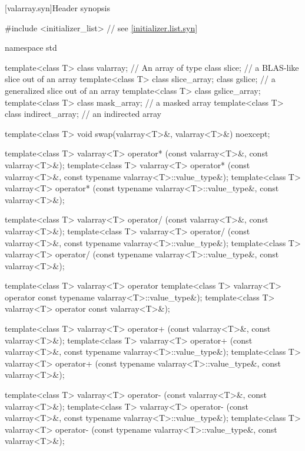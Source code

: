 [valarray.syn]{Header  synopsis}
%
\begin{codeblock}
#include <initializer_list>     // see \ref{initializer.list.syn}

namespace std {
  template<class T> class valarray;         // An array of type 
  class slice;                              // a BLAS-like slice out of an array
  template<class T> class slice_array;
  class gslice;                             // a generalized slice out of an array
  template<class T> class gslice_array;
  template<class T> class mask_array;       // a masked array
  template<class T> class indirect_array;   // an indirected array

  template<class T> void swap(valarray<T>&, valarray<T>&) noexcept;

  template<class T> valarray<T> operator* (const valarray<T>&, const valarray<T>&);
  template<class T> valarray<T> operator* (const valarray<T>&,
                                           const typename valarray<T>::value_type&);
  template<class T> valarray<T> operator* (const typename valarray<T>::value_type&,
                                           const valarray<T>&);

  template<class T> valarray<T> operator/ (const valarray<T>&, const valarray<T>&);
  template<class T> valarray<T> operator/ (const valarray<T>&,
                                           const typename valarray<T>::value_type&);
  template<class T> valarray<T> operator/ (const typename valarray<T>::value_type&,
                                           const valarray<T>&);

  template<class T> valarray<T> operator%
  template<class T> valarray<T> operator%
                                           const typename valarray<T>::value_type&);
  template<class T> valarray<T> operator%
                                           const valarray<T>&);

  template<class T> valarray<T> operator+ (const valarray<T>&, const valarray<T>&);
  template<class T> valarray<T> operator+ (const valarray<T>&,
                                           const typename valarray<T>::value_type&);
  template<class T> valarray<T> operator+ (const typename valarray<T>::value_type&,
                                           const valarray<T>&);

  template<class T> valarray<T> operator- (const valarray<T>&, const valarray<T>&);
  template<class T> valarray<T> operator- (const valarray<T>&,
                                           const typename valarray<T>::value_type&);
  template<class T> valarray<T> operator- (const typename valarray<T>::value_type&,
                                           const valarray<T>&);

}
\end{codeblock}
